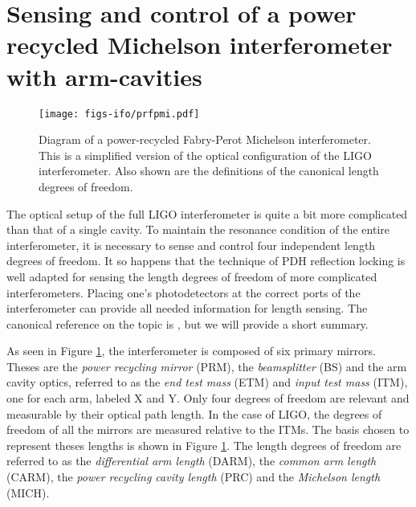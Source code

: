 \section{Sensing and control of a power recycled Michelson interferometer with arm-cavities}
\begin{figure}
  \begin{center}
  \leavevmode
  \texttt{[image: figs-ifo/prfpmi.pdf]}
  \end{center}
  \caption[Diagram of a power-recycled Fabry-Perot Michelson interferometer.]{Diagram of a power-recycled Fabry-Perot Michelson interferometer. This is a simplified version of the optical configuration of the LIGO interferometer. Also shown are the definitions of the canonical length degrees of freedom.}
  \label{fig:prfpmi}
\end{figure}
The optical setup of the full LIGO interferometer is quite a bit more complicated than that of a single cavity. %
To maintain the resonance condition of the entire interferometer, it is necessary to sense and control four independent length degrees of freedom. %
It so happens that the technique of PDH reflection locking is well adapted for sensing the length degrees of freedom of more complicated interferometers. %
Placing one's photodetectors at the correct ports of the interferometer can provide all needed information for length sensing. %
The canonical reference on the topic is \citet{Fritschel:01}, but we will provide a short summary.

As seen in Figure \ref{fig:prfpmi}, the interferometer is composed of six primary mirrors. %
Theses are the \emph{power recycling mirror} (PRM), the \emph{beamsplitter} (BS) and the arm cavity optics, referred to as the \emph{end test mass} (ETM) and \emph{input test mass} (ITM), one for each arm, labeled X and Y. %
Only four degrees of freedom are relevant and measurable by their optical path length. %
In the case of LIGO, the degrees of freedom of all the mirrors are measured relative to the ITMs. %
The basis chosen to represent theses lengths is shown in Figure \ref{fig:prfpmi}. %
The length degrees of freedom are referred to as the \emph{differential arm length} (DARM), the \emph{common arm length} (CARM), the \emph{power recycling cavity length} (PRC) and the \emph{Michelson length} (MICH).

